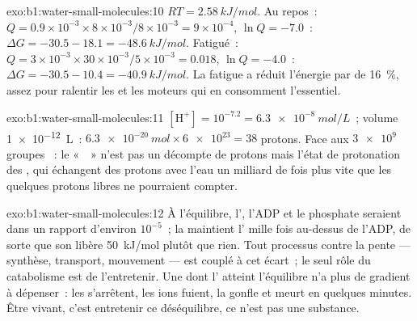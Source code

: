 \begin{solution}{exo:b1:water-small-molecules:10}
$RT = \qty{2.58}{kJ/mol}$. Au repos~: $Q = 0.9\times 10^{-3}\times 8\times
10^{-3}/8\times 10^{-3} = 9\times 10^{-4}$, $\ln Q = -7.0$~: $\Delta G =
-30.5 - 18.1 = \qty{-48.6}{kJ/mol}$. Fatigué~: $Q = 3\times 10^{-3}\times
30\times 10^{-3}/5\times 10^{-3} = 0.018$, $\ln Q = -4.0$~: $\Delta G =
-30.5 - 10.4 = \qty{-40.9}{kJ/mol}$. La fatigue a réduit l'énergie par
 de \qty{16}{\%}, assez pour ralentir les  et les moteurs qui
en consomment l'essentiel.
\end{solution}

\begin{solution}{exo:b1:water-small-molecules:11}
$[\mathrm{H^+}] = 10^{-7.2} = \qty{6.3e-8}{mol/L}$~; volume
\qty{1e-12}{L}~: $\qty{6.3e-20}{mol}\times\num{6e23} = 38$ protons. Face
aux $\num{3e9}$ groupes ~: le «~~» n'est pas un décompte de
protons mais l'état de protonation des , qui échangent des
protons avec l'eau un milliard de fois plus vite que les quelques
protons libres ne pourraient compter.
\end{solution}

\begin{solution}{exo:b1:water-small-molecules:12}
À l'équilibre, l', l'ADP et le phosphate seraient dans un rapport
d'environ $10^{-5}$~; la  maintient l' mille fois au-dessus de
l'ADP, de sorte que son  libère \qty{50}{kJ/mol} plutôt que
rien. Tout processus contre la pente --- synthèse, transport, mouvement
--- est couplé à cet écart~; le seul rôle du catabolisme est de
l'entretenir. Une  dont l' atteint l'équilibre n'a plus de
gradient à dépenser~: les  s'arrêtent, les ions fuient, la 
gonfle et meurt en quelques minutes. Être vivant, c'est entretenir ce
déséquilibre, ce n'est pas une substance.
\end{solution}

